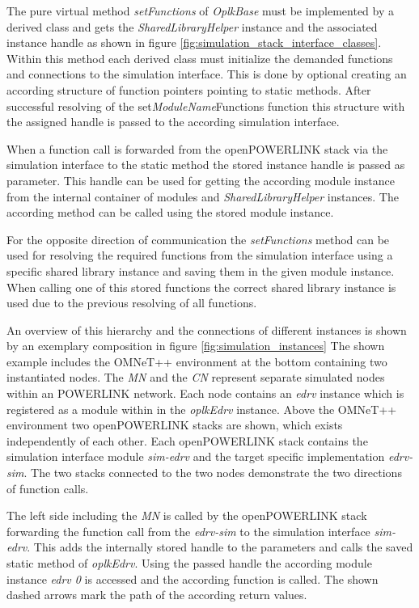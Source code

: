 The pure virtual method \emph{setFunctions} of \emph{OplkBase} must be implemented by a derived class and gets the \emph{SharedLibraryHelper} instance and the associated instance handle as shown in  figure \ref{fig:simulation_stack_interface_classes}.
Within this method each derived class must initialize the demanded functions and connections to the simulation interface.
This is done by optional creating an according structure of function pointers pointing to static methods.
After successful resolving of the set\emph{ModuleName}Functions function this structure with the assigned handle is passed to the according simulation interface.

When a function call is forwarded from the openPOWERLINK stack via the simulation interface to the static method the stored instance handle is passed as parameter.
This handle can be used for getting the according module instance from the internal container of modules and \emph{SharedLibraryHelper} instances.
The according method can be called using the stored module instance.

For the opposite direction of communication the \emph{setFunctions} method can be used for resolving the required functions from the simulation interface using a specific shared library instance and saving them in the given module instance.
When calling one of this stored functions the correct shared library instance is used due to the previous resolving of all functions.

An overview of this hierarchy and the connections of different instances is shown by an exemplary composition in figure \ref{fig:simulation_instances}
The shown example includes the OMNeT++ environment at the bottom containing two instantiated nodes.
The \emph{MN} and the \emph{CN} represent separate simulated nodes within an POWERLINK network.
Each node contains an \emph{edrv} instance which is registered as a module within in the \emph{oplkEdrv} instance.
Above the OMNeT++ environment two openPOWERLINK stacks are shown, which exists independently of each other.
Each openPOWERLINK stack contains the simulation interface module \emph{sim-edrv} and the target specific implementation \emph{edrv-sim}.
The two stacks connected to the two nodes demonstrate the two directions of function calls.

The left side including the \emph{MN} is called by the openPOWERLINK stack forwarding the function call from the \emph{edrv-sim} to the simulation interface \emph{sim-edrv}.
This adds the internally stored handle to the parameters and calls the saved static method of \emph{oplkEdrv}.
Using the passed handle the according module instance \emph{edrv 0} is accessed and the according function is called.
The shown dashed arrows mark the path of the according return values.

